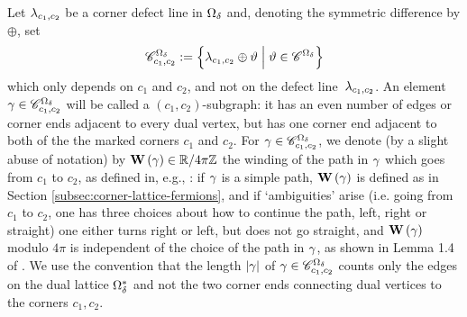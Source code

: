 \documentclass[12pt,oneside,english]{amsart}
\numberwithin{equation}{section}
\numberwithin{figure}{section}
\theoremstyle{plain}
\theoremstyle{plain}
\theoremstyle{plain}
\theoremstyle{plain}
\theoremstyle{remark}
\theoremstyle{definition}
\theoremstyle{plain}
\theoremstyle{plain}
\numberwithin{thm}{section}
\begin{document}
Let ${\lambda}_{c_{1},c_{2}}$ be a corner defect line in ${{\Omega}}_{{\delta}} $
and, denoting the symmetric difference by $\oplus$, set 
\[ {{\mathscr{C}}}_{{c_{1},c_{2}}}^{{{{\Omega}}_{{\delta}} }}
:= \left\{ {\lambda}_{c_{1},c_{2}} \oplus {\vartheta} \; \Big| \;
        {\vartheta} \in {{\mathscr{C}}}^{{{{\Omega}}_{{\delta}}}} \right\} \]
which only depends on $c_{1}$ and $c_{2}$, and not on the defect 
line~${\lambda}_{c_{1},c_{2}}$.
An element ${\gamma} \in {{\mathscr{C}}}_{{c_{1},c_{2}}}^{{{{\Omega}}_{{\delta}} }}$ 
will be called a $(c_1,c_2)$-subgraph: it has an even 
number of edges or corner ends adjacent to every dual vertex, but has one 
corner end adjacent to both of the the marked corners $c_{1}$ and $c_{2}$. 
For ${\gamma} \in {{\mathscr{C}}}_{{c_{1},c_{2}}}^{{{{\Omega}}_{{\delta}} }}$,
we denote (by a slight abuse of notation) by 
$\mathbf{W}\left({\gamma}\right)\in 
\mathbb{R}/4\pi\mathbb{Z} $
the winding of the path in ${\gamma}$ which goes from $c_{1}$ to $c_{2}$, as 
defined
in, e.g., \cite{hongler-smirnov}: if ${\gamma}$ is a simple path, 
$\mathbf{W}\left({\gamma}\right)$
is defined as in Section \ref{subsec:corner-lattice-fermions}, and
if `ambiguities' arise (i.e. going from $c_{1}$ to $c_{2}$, one
has three choices about how to continue the path, left, right or straight)
one either turns right or left, but does not go straight, and 
$\mathbf{W}\left({\gamma}\right)$
modulo $4\pi$ is independent of the choice of the path in ${\gamma}$,
as shown in Lemma 1.4 of \cite{hongler-smirnov}.
We use the convention that the length $|{\gamma}|$ of
${\gamma} \in {{\mathscr{C}}}_{{c_{1},c_{2}}}^{{{{\Omega}}_{{\delta}} }}$ counts only the edges on 
the 
dual lattice ${{\Omega}}_{{\delta}}^*$ and not the two corner ends connecting dual vertices 
to the corners $c_1 , c_2$.
\end{document}
